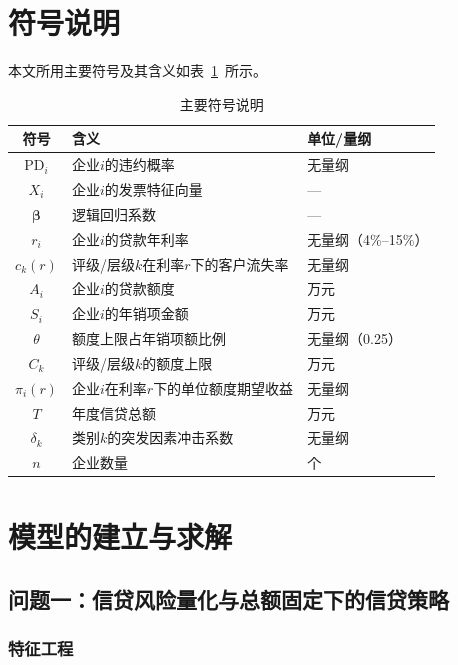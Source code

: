 \documentclass[12pt, a4paper]{article}
\begin{document}
\section{符号说明}

本文所用主要符号及其含义如表~\ref{tab:symbols}~所示。

\begin{table}[H]
\centering
\caption{主要符号说明}
\label{tab:symbols}
\begin{tabular}{cll}
\toprule
\textbf{符号} & \textbf{含义} & \textbf{单位/量纲} \\
\midrule
$\mathrm{PD}_i$ & 企业$i$的违约概率 & 无量纲 \\
$X_i$   & 企业$i$的发票特征向量 & — \\
$\boldsymbol{\beta}$ & 逻辑回归系数 & — \\
$r_i$   & 企业$i$的贷款年利率 & 无量纲（4\%--15\%） \\
$c_k(r)$ & 评级/层级$k$在利率$r$下的客户流失率 & 无量纲 \\
$A_i$   & 企业$i$的贷款额度 & 万元 \\
$S_i$   & 企业$i$的年销项金额 & 万元 \\
$\theta$ & 额度上限占年销项额比例 & 无量纲（0.25） \\
$C_k$   & 评级/层级$k$的额度上限 & 万元 \\
$\pi_i(r)$ & 企业$i$在利率$r$下的单位额度期望收益 & 无量纲 \\
$T$     & 年度信贷总额 & 万元 \\
$\delta_k$ & 类别$k$的突发因素冲击系数 & 无量纲 \\
$n$     & 企业数量 & 个 \\
\bottomrule
\end{tabular}
\end{table}

\section{模型的建立与求解}

\subsection{问题一：信贷风险量化与总额固定下的信贷策略}

\subsubsection{特征工程}
\end{document}
